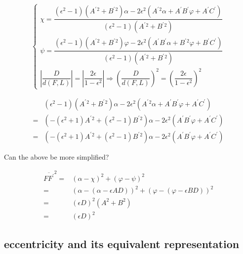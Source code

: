 \documentclass[
]{book}
\theoremstyle{definition}
\theoremstyle{definition}
\theoremstyle{definition}
\theoremstyle{definition}
\theoremstyle{remark}
\begin{document}
\[
\begin{cases}
\chi=\dfrac{\left(\epsilon^{2}-1\right)\left(A^{\prime}{}^{2}+B^{\prime}{}^{2}\right)\alpha-2\epsilon^{2}\left(A^{\prime}{}^{2}\alpha+A^{\prime}B^{\prime}\varphi+A^{\prime}C^{\prime}\right)}{\left(\epsilon^{2}-1\right)\left(A^{\prime}{}^{2}+B^{\prime}{}^{2}\right)}\\
\psi=\dfrac{\left(\epsilon^{2}-1\right)\left(A^{\prime}{}^{2}+B^{\prime}{}^{2}\right)\varphi-2\epsilon^{2}\left(A^{\prime}B^{\prime}\alpha+B^{\prime}{}^{2}\varphi+B^{\prime}C^{\prime}\right)}{\left(\epsilon^{2}-1\right)\left(A^{\prime}{}^{2}+B^{\prime}{}^{2}\right)}\\
\left|\dfrac{D}{d\left(F,L\right)}\right|=\left|\dfrac{2\epsilon}{1-\epsilon^{2}}\right|\Rightarrow\left(\dfrac{D}{d\left(F,L\right)}\right)^{2}=\left(\dfrac{2\epsilon}{1-\epsilon^{2}}\right)^{2}
\end{cases}
\]

\[
\begin{aligned}
 & \left(\epsilon^{2}-1\right)\left(A^{\prime}{}^{2}+B^{\prime}{}^{2}\right)\alpha-2\epsilon^{2}\left(A^{\prime}{}^{2}\alpha+A^{\prime}B^{\prime}\varphi+A^{\prime}C^{\prime}\right)\\
= & \left(-\left(\epsilon^{2}+1\right)A^{\prime}{}^{2}+\left(\epsilon^{2}-1\right)B^{\prime}{}^{2}\right)\alpha-2\epsilon^{2}\left(A^{\prime}B^{\prime}\varphi+A^{\prime}C^{\prime}\right)\\
= & \left(-\left(\epsilon^{2}+1\right)A^{\prime}{}^{2}+\left(\epsilon^{2}-1\right)B^{\prime}{}^{2}\right)\alpha-2\epsilon^{2}\left(A^{\prime}B^{\prime}\varphi+A^{\prime}C^{\prime}\right)
\end{aligned}
\]

Can the above be more simplified?

\[
\begin{aligned}
\overline{FF^{\prime}}^{2}= & \left(\alpha-\chi\right)^{2}+\left(\varphi-\psi\right)^{2}\\
= & \left(\alpha-\left(\alpha-\epsilon AD\right)\right)^{2}+\left(\varphi-\left(\varphi-\epsilon BD\right)\right)^{2}\\
= & \left(\epsilon D\right)^{2}\left(A^{2}+B^{2}\right)\\
= & \left(\epsilon D\right)^{2}
\end{aligned}
\]

\subsection{eccentricity and its equivalent representation}\label{eccentricity-and-its-equivalent-representation}
\end{document}
